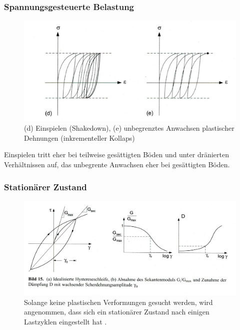 \begin{frame}
\frametitle{Spannungsgesteuerte Belastung}
\begin{figure}
\centering
\includegraphics[width=0.75\linewidth]{fig_img/bild14de.jpg}
\caption*{(d) Einspielen (Shakedown), (e) unbegrenztes Anwachsen plastischer Dehnungen (inkrementeller Kollaps) \cite{Vrettos2017}} 
\end{figure}
Einspielen tritt eher bei teilweise gesättigten Böden und unter dränierten Verhältnissen auf, das unbegrente Anwachsen eher bei gesättigten Böden.
\end{frame}

\begin{frame}
\frametitle{Stationärer Zustand}
\begin{figure}
\centering
\includegraphics[width=\linewidth]{fig_img/bild15.jpg}
\caption*{Solange keine plastischen Verformungen gesucht werden,
wird angenommen, dass sich ein stationärer Zustand nach einigen Lastzyklen eingestellt hat \cite{Vrettos2017}.} 
\end{figure}
\end{frame}


